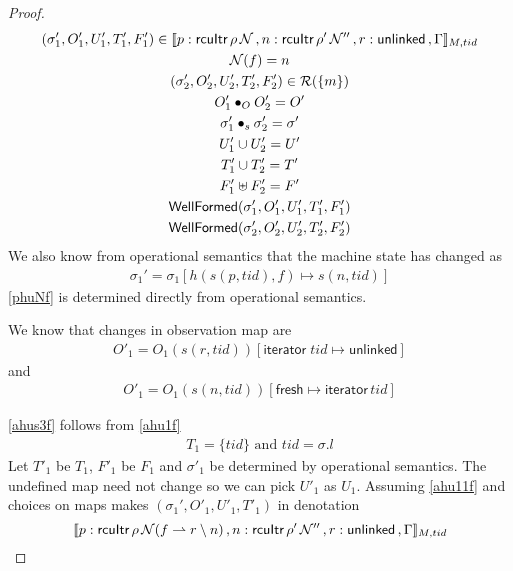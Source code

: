 \begin{proof}
\begin{gather}\label{phu5f}
\begin{aligned}
(\sigma_1',O'_{1},U'_{1}, T'_{1},F'_1)  \in \llbracket p:\textsf{rcuItr}\, \rho \, \mathcal{N} \, , n:\textsf{rcuItr}\, \rho' \, \mathcal{N}'' \, , r:\textsf{unlinked}\, ,  \Gamma \rrbracket_{M,tid}
\end{aligned}
\\
\label{phuNf}
\mathcal{N}(f)=n 
\\
\label{phu6f}
(\sigma_2',O'_{2},U'_{2}, T'_{2}, F'_2) \in \mathcal{R}(\{m\})
\\
\label{phu7f}
O'_{1} \bullet_{O} O'_{2} = O'
\\
\label{ahusigf'}
\sigma'_1 \bullet_s \sigma'_2 = \sigma' \\
\label{phu8f}
U'_{1} \cup U'_{2} = U'
\\
\label{phu9f}
T'_{1} \cup T'_{2} = T'
\\
\label{phufff}
F'_1 \uplus F'_2 = F'
\\
\label{phu10f}
\textsf{WellFormed}(\sigma_1',O'_{1},U'_{1},T'_{1},F'_1) \\
\label{phu11f}
\textsf{WellFormed}(\sigma_2',O'_{2},U'_{2},T'_{2},F'_2)
\end{gather}
We also know from operational semantics that the machine state has changed as
\begin{gather}\label{ahusf}
\sigma_1' =  \sigma_1[h(s(p,tid),f ) \mapsto s(n,tid) ]
\end{gather}
\ref{phuNf} is determined directly from operational semantics.

We know that changes in observation map are
\begin{gather}\label{ahus1f}
O'_1 =  O_1(s(r,tid))[\textsf{iterator}\;tid \mapsto \textsf{unlinked}]
\end{gather}
and
\begin{gather}\label{ahus2f}
O'_1 =  O_1(s(n,tid))[\textsf{fresh} \mapsto \textsf{iterator}\,tid]
\end{gather}

\ref{ahus3f} follows from \ref{ahu1f}
\begin{gather}\label{ahus3f}
  T_1 = \{tid\} \text{ and } tid = \sigma.l
\end{gather}
Let $T'_1$ be $T_1$, $F'_1$ be $F_1$ and $\sigma'_1$ be determined by operational semantics. The undefined map need not change so we can pick $U'_1$ as $U_1$. Assuming \ref{ahu11f} and choices on maps makes $(\sigma_1',O'_{1},U'_{1}, T'_{1})$ in denotation
\[\llbracket p:\textsf{rcuItr}\, \rho \, \mathcal{N}(f \rightharpoonup r \setminus n) \, , n:\textsf{rcuItr}\, \rho' \, \mathcal{N}'' \, , r:\textsf{unlinked}\, ,  \Gamma \rrbracket_{M,tid}\]


\end{proof}

